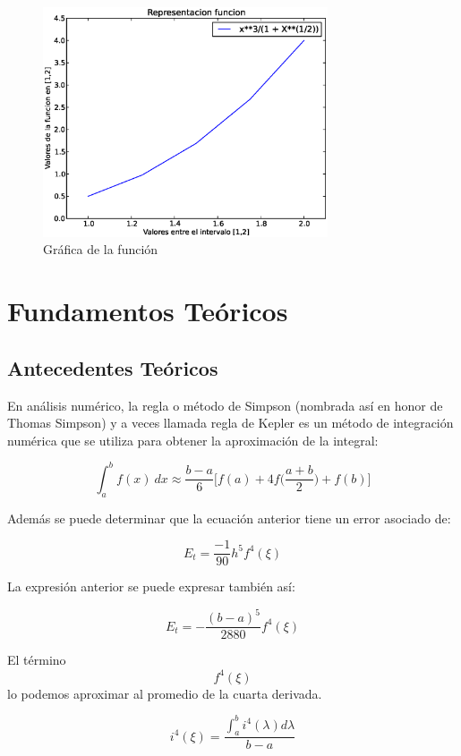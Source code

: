 \documentclass[spanish,a4paper,11pt]{report}
\begin{document}
\begin{figure}[ptb]
\begin{center}
\includegraphics[width=0.75\textwidth]{tmp2.eps}
\caption{Gráfica de la función}
\label{fig:1}
\end{center}
\end{figure}


\chapter{Fundamentos Teóricos}


\section{Antecedentes Teóricos}   
\label{chapter:teo}

\parindent=1cm En análisis numérico, la regla o método de Simpson (nombrada así en honor de Thomas Simpson) y a veces llamada 
regla de Kepler es un método de integración numérica que se utiliza para obtener la aproximación de la integral:

\[\int_a^{b}f(x) \: dx \approx \frac{b-a}{6} \Bigg[f(a)+4f\Big(\frac{a+b}{2}\Big)+f(b)\Bigg]\]


Además se puede determinar que la ecuación anterior tiene un error asociado de:

\[E_t = \frac{-1}{90}h^5 f^4(\xi)\]

La expresión anterior se puede expresar también así:

\[E_t = -\frac{(b-a)^5}{2880}f^4(\xi)\]

El término \[f^4(\xi)\] lo podemos  aproximar al promedio de la cuarta derivada.

\[i^4(\xi) = \frac{\int_a^{b} i^4 (\lambda)d\lambda }{b-a}\]
\end{document}
